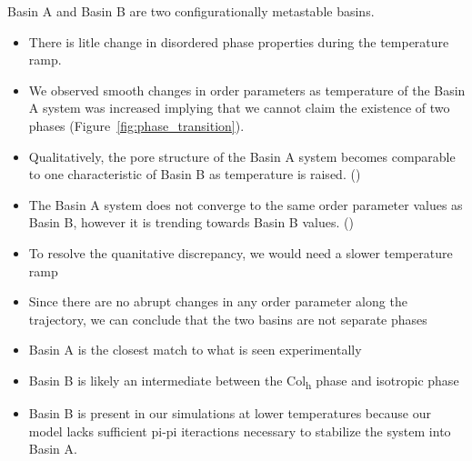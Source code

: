 \documentclass{article}
\begin{document}
  Basin A and Basin B are two configurationally metastable basins.
  \begin{itemize}
        \item There is litle change in disordered phase properties during the 
        temperature ramp.
	\item We observed smooth changes in order parameters as temperature
        of the Basin A system was increased implying that we cannot claim the
	existence of two phases (Figure~\ref{fig:phase_transition}).
	\item Qualitatively, the pore structure of the Basin A system becomes
        comparable to one characteristic of Basin B as temperature is raised. ()
	\item The Basin A system does not converge to the same order parameter
	values as Basin B, however it is trending towards Basin B values. ()
	\item To resolve the quanitative discrepancy, we would need a slower 
	temperature ramp
	\item Since there are no abrupt changes in any order parameter along the 
	trajectory, we can conclude that the two basins are not separate phases
	\item Basin A is the closest match to what is seen experimentally
	\item Basin B is likely an intermediate between the Col\textsubscript{h} 
	phase and isotropic phase
	\item Basin B is present in our simulations at lower temperatures 
	because our model lacks sufficient pi-pi iteractions necessary to 
	stabilize the system into Basin A. 
  \end{itemize} 
\end{document}

